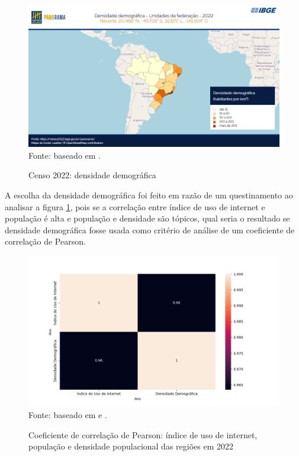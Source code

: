 \begin{figure}[H]
    \centering
    \caption{Censo 2022: densidade demográfica}
    \includegraphics[width=1\linewidth]{figuras/populacao/censo_2022_densidade_demografica.png}
    \label{fig:densidade_demografica}
    \footnotesize{Fonte: baseado em \cite{IBGE_censo_2022}.}
\end{figure}

A escolha da densidade demográfica foi feito em razão de um questinamento ao analisar a figura \ref{fig:densidade_demografica}, pois se a correlação entre índice de uso de internet e população é alta e população e densidade são tópicos, qual seria o resultado se densidade demográfica fosse usada como critério de análise de um coeficiente de correlação de Pearson.

\begin{figure}[H]
    \centering
    \caption{Coeficiente de correlação de Pearson: índice de uso de internet, população e densidade populacional das regiões em 2022}
    \includegraphics[width=1\linewidth]{figuras/internet/correlacao2.png}
    \label{fig:correlacao2}
    \footnotesize{Fonte: baseado em \cite{IBGE_censo_2022} e \cite{pnda_continua_anual_2016_2023}.}
\end{figure}